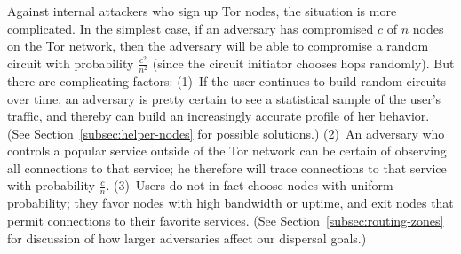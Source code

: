 \documentclass{llncs}
\newenvironment{tightlist}{\begin{list}{$\bullet$}{
  \setlength{\itemsep}{0mm}
    \setlength{\parsep}{0mm}
    }}{\end{list}}
\begin{document}
Against internal attackers who sign up Tor nodes, the situation is more
complicated.  In the simplest case, if an adversary has compromised $c$ of
$n$ nodes on the Tor network, then the adversary will be able to compromise
a random circuit with probability $\frac{c^2}{n^2}$ (since the circuit
initiator chooses hops randomly).  But there are
complicating factors:
(1)~If the user continues to build random circuits over time, an adversary
  is pretty certain to see a statistical sample of the user's traffic, and
  thereby can build an increasingly accurate profile of her behavior.  (See
  Section~\ref{subsec:helper-nodes} for possible solutions.)
(2)~An adversary who controls a popular service outside of the Tor network
  can be certain of observing all connections to that service; he
  therefore will trace connections to that service with probability
  $\frac{c}{n}$.
(3)~Users do not in fact choose nodes with uniform probability; they
  favor nodes with high bandwidth or uptime, and exit nodes that
  permit connections to their favorite services. 
(See Section~\ref{subsec:routing-zones} for discussion of how larger
adversaries affect our dispersal goals.)


%
\end{document}
